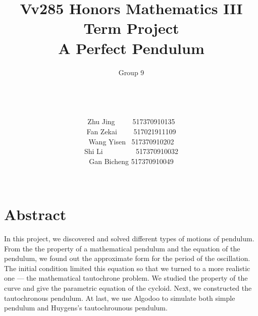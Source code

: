 \documentclass{article}
\title{\textbf{Vv285 Honors Mathematics III\\\vspace{0.7em}}\Huge{\textbf{Term Project\vspace{0.7em}}}\\ \LARGE\textbf{A Perfect Pendulum\\\vspace{2em}}}
\author{\LARGE{Group 9}\\\\\\\\\vspace{0.5em} \\\vspace{0.5em}\Large{Zhu Jing~~~~~517370910135}\\\vspace{0.5em}\Large{Fan Zekai~~~~ 517021911109}\\\vspace{0.5em}\Large{Wang Yisen~ 517370910202}\\\vspace{0.5em}\Large{Shi Li  ~~~~~~~ ~517370910032}\\\vspace{0.5em}\Large{Gan Bicheng   517370910049}\\\\\vspace{2em}}
\begin{document}
\begin{figure}


\end{figure}
\maketitle
\thispagestyle{empty}

\newpage
\section*{Abstract}
 \par In this project, we discovered and solved different types of  motions of pendulum. From the the property of a mathematical pendulum and the equation of the pendulum, we found out the approximate form for the period of the oscillation. The initial condition limited this equation so that we turned to a more realistic one --- the mathematical tautochrone problem. We studied the property of the curve and give the parametric equation of the cycloid. Next, we constructed the tautochronous pendulum. At last, we use Algodoo to simulate both simple pendulum and Huygens’s tautochrounous pendulum.
\thispagestyle{empty}

\newpage
\tableofcontents


\newpage
\end{document}
